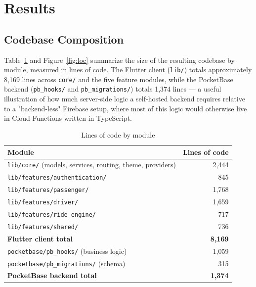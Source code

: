 \documentclass[11pt,a4paper]{article}
\begin{document}
\section{Results}
\label{sec:results}

\subsection{Codebase Composition}

Table~\ref{tab:loc} and Figure~\ref{fig:loc} summarize the size of the
resulting codebase by module, measured in lines of code. The Flutter client
(\texttt{lib/}) totals approximately 8{,}169 lines across \texttt{core/} and the
five feature modules, while the PocketBase backend (\texttt{pb\_hooks/} and
\texttt{pb\_migrations/}) totals 1{,}374 lines --- a useful illustration of how
much server-side logic a self-hosted backend requires relative to a
"backend-less" Firebase setup, where most of this logic would otherwise live
in Cloud Functions written in TypeScript.

\begin{table}[htbp]
\centering
\caption{Lines of code by module}
\label{tab:loc}
\begin{tabular}{@{}lr@{}}
\toprule
\textbf{Module} & \textbf{Lines of code} \\
\midrule
\texttt{lib/core/} (models, services, routing, theme, providers) & 2{,}444 \\
\texttt{lib/features/authentication/} & 845 \\
\texttt{lib/features/passenger/} & 1{,}768 \\
\texttt{lib/features/driver/} & 1{,}659 \\
\texttt{lib/features/ride\_engine/} & 717 \\
\texttt{lib/features/shared/} & 736 \\
\midrule
\textbf{Flutter client total} & \textbf{8{,}169} \\
\midrule
\texttt{pocketbase/pb\_hooks/} (business logic) & 1{,}059 \\
\texttt{pocketbase/pb\_migrations/} (schema) & 315 \\
\midrule
\textbf{PocketBase backend total} & \textbf{1{,}374} \\
\bottomrule
\end{tabular}
\end{table}
\end{document}
